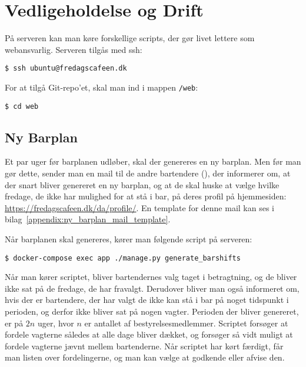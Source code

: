 \section{Vedligeholdelse og Drift}
\label{sec:vedligeholdelse-og-drift}

På serveren kan man køre forskellige scripts, der gør livet lettere som webansvarlig.
Serveren tilgås med ssh:

\begin{verbatim}
$ ssh ubuntu@fredagscafeen.dk
\end{verbatim}

For at tilgå Git-repo'et, skal man ind i mappen \texttt{/web}:

\begin{verbatim}
$ cd web
\end{verbatim}

\subsection{Ny Barplan}
\label{sec:ny-barplan}

Et par uger før barplanen udløber, skal der genereres en ny barplan.
Men før man gør dette, sender man en mail til de andre bartendere (\allemail), 
der informerer om, at der snart bliver genereret en ny barplan, og at de skal huske at vælge hvilke 
fredage, de ikke har mulighed for at stå i bar, på deres profil på hjemmesiden: 
\url{https://fredagscafeen.dk/da/profile/}. 
En template for denne mail kan ses i bilag~\ref{appendix:ny_barplan_mail_template}.

Når barplanen skal genereres, kører man følgende script på serveren:

\begin{verbatim}
$ docker-compose exec app ./manage.py generate_barshifts
\end{verbatim}

Når man kører scriptet, bliver bartendernes valg taget i betragtning, og de bliver ikke sat på de
fredage, de har fravalgt. Derudover bliver man også informeret om, hvis der er bartendere, der har
valgt de ikke kan stå i bar på noget tidspunkt i perioden, og derfor ikke bliver sat på nogen vagter.
Perioden der bliver genereret, er på $2n$ uger, hvor $n$ er antallet af bestyrelsesmedlemmer.
Scriptet forsøger at fordele vagterne således at alle dage bliver dækket, og forsøger så vidt muligt
at fordele vagterne jævnt mellem bartenderne.
Når scriptet har kørt færdigt, får man listen over fordelingerne, og man kan vælge at godkende eller
afvise den.

